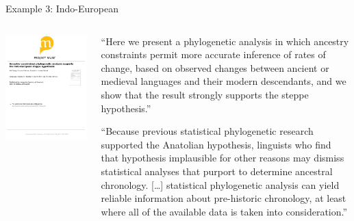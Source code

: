 \documentclass[9pt]{beamer}
\begin{document}
\begin{frame}{Example 3: Indo-European}
  \begin{columns}
    \begin{column}{0.5\textwidth}
      \footnotemark\includegraphics[width=\textwidth,page=7,trim={2cm 9.8cm 2.5cm 1.8cm},clip]{chang2015ancestry.pdf}
    \end{column}
    \begin{column}{0.5\textwidth}
      \footnotesize “Here we present a phylogenetic analysis in which ancestry
      constraints permit more accurate inference of rates of change, based on
      observed changes between ancient or medieval languages and their modern
      descendants, and we show that the result strongly supports the steppe
      hypothesis.”

      “Because previous statistical phylogenetic research supported the
      Anatolian hypothesis, linguists who find that hypothesis implausible for
      other reasons may dismiss statistical analyses that purport to determine
      ancestral chronology. […] statistical phylogenetic analysis can yield
      reliable information about pre-historic chronology, at least where all of
      the available data is taken into consideration.”
    \end{column}
  \end{columns}
\end{frame}
\end{document}
